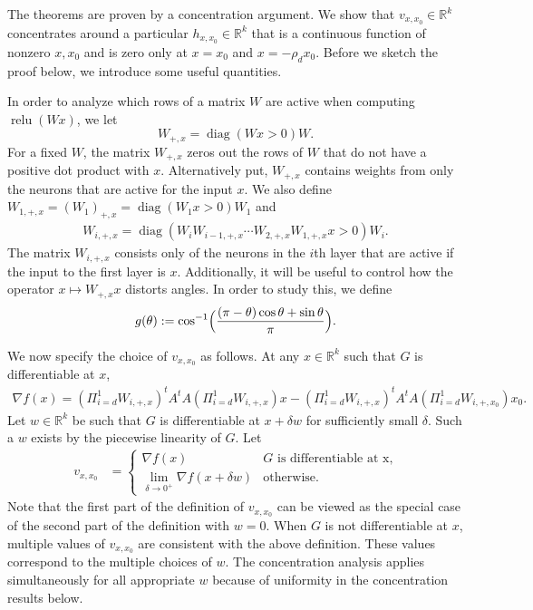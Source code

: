 \documentclass[11pt]{article}
\newcommand{\R}{\mathbb{R}}
\newcommand{\tran}{t}
\newcommand{\xo}{x_0}
\newcommand{\Wplus}[1]{W_{+, #1}}
\newcommand{\Wpx}{\Wplus{x}}
\newcommand{\AtA}{A^\tran A}
\newcommand{\hxxo}{h_{x, \xo}}
\newcommand{\PiWd}{\Pi_{i=d}^1 W_{i,+,x}}
\newcommand{\PiWdo}{\Pi_{i=d}^1 W_{i,+,\xo}}
\newcommand{\Wnpx}[1]{W_{#1, +, x}}
\newcommand{\Wipx}{W_{i, +, x}}
\newcommand{\Win}[1]{W_{#1}}
\newcommand{\Wi}{\Win{i}}
\newcommand{\vxxo}{v_{x, \xo}}
\DeclareMathOperator{\relu}{relu}
\DeclareMathOperator{\diag}{diag}
\begin{document}
The theorems are proven by a concentration argument.  We show that $\vxxo \in \R^k$ concentrates around a particular $\hxxo \in \R^k$ that is a continuous function of nonzero $x,\xo$ and is zero only at $x = \xo$ and $x = - \rho_d \xo$.  Before we sketch the proof below, we introduce some useful quantities.

In order to analyze which rows of a matrix $W$ are active when computing $\relu(Wx)$, we let 
\[
\Wpx = \diag(Wx>0) W.
\]
For a fixed $W$, the matrix $\Wpx$ zeros out the rows of $W$ that do not have a positive dot product with $x$.  Alternatively put, $\Wpx$ contains weights from only the neurons that are active for the input $x$.  We also define $\Wnpx{1} = (W_1)_{+,x} =  \diag(W_{1}x>0) W_1$ and  
\begin{align*}
\Wipx = \diag(\Wi \Wnpx{i-1} \cdots \Wnpx{2} \Wnpx{1} x > 0) \Wi.
\end{align*}
The matrix $\Wipx$ consists only of the neurons in the $i$th layer that are active if the input to the first layer is  $x$.  Additionally, it will be useful to control how the operator $x\mapsto W_{+,x} x$ distorts angles. In order to study this, we define 
\begin{align}
g(\theta) := \cos^{-1} \Bigl( \frac{ (\pi - \theta) \cos \theta + \sin \theta}{\pi} \Bigr). \label{defn-g}
\end{align}

We now specify the choice of $\vxxo$ as follows.
At any $x \in \R^k$ such that $G$ is differentiable at $x$,
\begin{align}
 \nabla f(x) = (\PiWd)^t \AtA (\PiWd) x -  (\PiWd)^t \AtA (\PiWdo) \xo. \label{defn-nabla-f}
\end{align}
Let $w\in \R^k$ be such that $G$ is differentiable at $x+\delta w$ for sufficiently small $\delta$.  Such a $w$ exists by the piecewise linearity of $G$. 
 Let
\begin{align}
\vxxo &= \begin{cases}\nabla f(x) & G \text{ is differentiable at x,}\\ \lim_{\delta \to 0^+} \nabla f(x + \delta w) & \text{otherwise.} \end{cases} \label{defn-vxxo}
\end{align}
Note that the first part of the definition of $\vxxo$ can be viewed as the special case of the second part of the definition with $w=0$.  When $G$ is not differentiable at $x$, multiple values of $\vxxo$ are consistent with the above definition.  These values correspond to the multiple choices of $w$.  The concentration analysis applies simultaneously for all appropriate $w$ because of uniformity in the concentration results below.  
\end{document}
